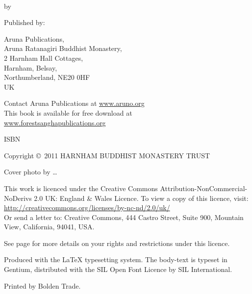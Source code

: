 {\small\setlength{\parskip}{0.8em}\setlength{\parindent}{0em}%
{\raggedright%

\thetitle\\
by \theauthor

Published by:

Aruna Publications,\\
Aruna Ratanagiri Buddhist Monastery,\\
2 Harnham Hall Cottages,\\
Harnham, Belsay,\\
Northumberland, NE20 0HF\\
UK

Contact Aruna Publications at \href{http://aruno.org}{www.aruno.org}\\
This book is available for free download at\\
\href{http://forestsanghapublications.org/}{www.forestsanghapublications.org}

ISBN \theISBN

Copyright \copyright\ 2011 HARNHAM BUDDHIST MONASTERY TRUST

Cover photo by \ldots

\vfill

{\tiny

This work is licenced under the Creative Commons Attribution-NonCommercial-NoDerivs 2.0 UK: England \& Wales Licence. To view a copy of this licence, visit:\\
\href{http://creativecommons.org/licenses/by-nc-nd/2.0/uk/}{http://creativecommons.org/licenses/by-nc-nd/2.0/uk/}\\
Or send a letter to: Creative Commons, 444 Castro Street, Suite 900, Mountain View, California, 94041, USA.

See page \pageref{copyright-details} for more details on your rights and restrictions under this licence.

Produced with the {\selectfont\LaTeX} typesetting system. The body-text is typeset in Gentium, distributed with the SIL Open Font Licence by SIL International.

\theEditionInfo

Printed by Bolden Trade.

}

}}

